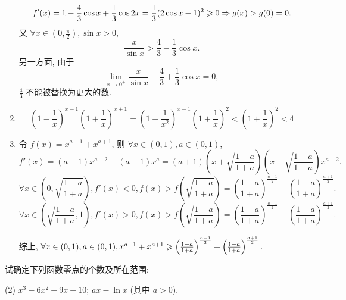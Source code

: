 \begin{solution}
\begin{enumerate}
              $$ f'(x) = 1 - \frac{4}{3} \cos x + \frac{1}{3} \cos 2x = \frac{1}{3} (2 \cos x - 1)^2 \geqslant 0 \Rightarrow g(x) > g(0) = 0. $$
              又 $\forall x \in (0, \frac{\pi}{2}), \sin x > 0,$
              $$ \frac{x}{\sin x} > \frac{4}{3} - \frac{1}{3} \cos x. $$
              另一方面, 由于
              $$ \lim_{x \to 0^+} \frac{x}{\sin x} - \frac{4}{3} + \frac{1}{3} \cos x = 0, $$
              $\frac{4}{3}$ 不能被替换为更大的数.
        \item $$ \left(1-\frac{1}{x}\right)^{x-1} \left(1+\frac{1}{x}\right)^{x+1} = \left(1-\frac{1}{x^2}\right)^{x-1} \left(1+\frac{1}{x}\right)^2 < \left(1+\frac{1}{x}\right)^2 < 4 $$
        \item 令 $f(x) = x^{a-1} + x^{a+1}$, 则 $\forall x \in (0, 1), a \in (0, 1)$,
              $$ f'(x) = (a-1)x^{a-2} + (a+1)x^a = (a+1) \left(x + \sqrt{\frac{1-a}{1+a}}\right) \left(x - \sqrt{\frac{1-a}{1+a}}\right) x^{a-2}. $$
              $$\forall x \in \left(0, \sqrt{\frac{1-a}{1+a}}\right), f'(x) < 0, f(x) > f\left(\sqrt{\frac{1-a}{1+a}}\right) = \left(\frac{1-a}{1+a}\right)^{\frac{a-1}{2}} + \left(\frac{1-a}{1+a}\right)^{\frac{a+1}{2}}.$$
              $$\forall x \in \left(\sqrt{\frac{1-a}{1+a}}, 1\right), f'(x) > 0, f(x) > f\left(\sqrt{\frac{1-a}{1+a}}\right) = \left(\frac{1-a}{1+a}\right)^{\frac{a-1}{2}} + \left(\frac{1-a}{1+a}\right)^{\frac{a+1}{2}}.$$

              综上,
              $\forall x \in (0, 1), a \in (0, 1), x^{a-1} + x^{a+1} \geqslant \left(\frac{1-a}{1+a}\right)^{\frac{a-1}{2}} + \left(\frac{1-a}{1+a}\right)^{\frac{a+1}{2}}.$
    \end{enumerate}
\end{solution}

\begin{exercise}[3.3.24]
    试确定下列函数零点的个数及所在范围:
    \begin{tasks}[label=(\arabic*)](2)
        \task $x^3-6x^2+9x-10$;
        \task $ax-\ln x$ (其中 $a>0$).
    \end{tasks}
\end{exercise}

